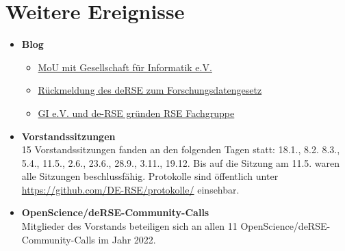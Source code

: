 \section{Weitere Ereignisse}

\begin{itemize}
 \item \textbf{Blog}
 \begin{itemize}
  \item \href{https://de-rse.org/blog/2023/02/03/Gesellschaft-fuer-Informatik-und-de-RSE-wollen-enger-zusammenarbeiten.html}{MoU mit Gesellschaft für Informatik e.V.}
  \item \href{https://de-rse.org/blog/2023/04/05/R\%C3\%BCckmeldung-des-deRSE-zum-Forschungsdatengesetz.html}{Rückmeldung des deRSE zum Forschungsdatengesetz}
  \item \href{https://de-rse.org/blog/2023/07/18/RSE-Fachgruppe-de.html}{GI e.V. und de-RSE gründen RSE Fachgruppe}
 \end{itemize}
 \item \textbf{Vorstandssitzungen}\\
  15 Vorstandssitzungen fanden an den folgenden Tagen statt: 18.1., 8.2. 8.3., 5.4., 11.5., 2.6., 23.6., 28.9., 3.11., 19.12.
  Bis auf die Sitzung am 11.5. waren alle Sitzungen beschlussfähig.
  Protokolle sind öffentlich unter \href{https://github.com/DE-RSE/protokolle/}{https://github.com/DE-RSE/protokolle/} einsehbar.
 \item \textbf{OpenScience/deRSE-Community-Calls}\\
 Mitglieder des Vorstands beteiligen sich an allen 11 OpenScience/deRSE-Community-Calls im Jahr 2022.
\end{itemize}




